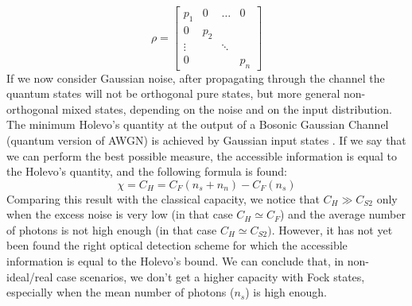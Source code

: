 \documentclass[journal, letterpaper]{IEEEtran}
\begin{document}
\[\rho = \begin{bmatrix}
    p_1 & 0 & \dots & 0\\
    0 & p_2 &  &  \\
    \vdots &  & \ddots &  \\
    0 &  &  & p_n
\end{bmatrix}\] 
 If we now consider Gaussian noise, after propagating through the channel the quantum states will not be orthogonal pure states, but more general non-orthogonal mixed states, depending on the noise and on the input distribution.
 The minimum Holevo's quantity at the output of a Bosonic Gaussian Channel (quantum version of AWGN) is achieved by Gaussian input states \cite{giovannetti}. If we say that we can perform the best possible measure, the accessible information is equal to the Holevo's quantity, and the following formula is found: 
\[\chi = C_{H} = C_{F}(n_s+n_n)-C_{F}(n_s)\]
  Comparing this result with the classical capacity, we notice that $C_{H}\gg C_{S2}$ only when the excess noise is very low (in that case $C_{H} \simeq C_{F}$) and the average number of photons is not high enough (in that case $C_{H} \simeq C_{S2})$. However, it has not yet been found the right optical detection scheme for which the accessible information is equal to the Holevo's bound. We can conclude that, in non-ideal/real case scenarios, we don't get a higher capacity with Fock states, especially when the mean number of photons ($n_s$) is high enough. 
\end{document}
